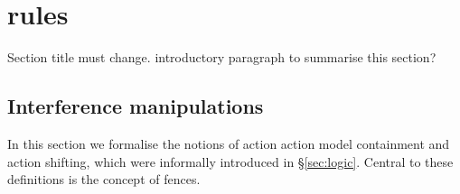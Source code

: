 \section{\colosl rules}
\todo Section title must change.
\todo introductory paragraph to summarise this section?
\subsection{Interference manipulations}\label{subsec:extension}
In this section we formalise the notions of action action model containment and action shifting, which were informally introduced in \S\ref{sec:logic}. Central to these definitions is the concept of fences.
%
